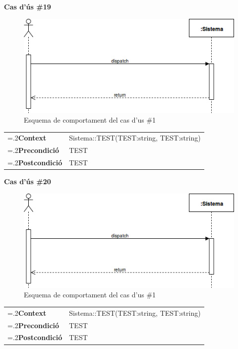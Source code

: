 \clearpage
\noindent\textbf{\large Cas d'ús \#19}\\
\begin{figure}[H]
\centering
\includegraphics[scale=0.6]{Figures/casdus_00.png}
\caption{Esquema de comportament del cas d'us \#1}
\end{figure}
\begin{table}[h]
\noindent
\begin{tabularx}{\linewidth}{
>{\hsize=.2\hsize}X%
>{\hsize=0.8\hsize}X%
}
\textbf{Context} 		& Sistema::TEST(TEST:string, TEST:string) \\
\textbf{Precondició} 	& TEST \\
\textbf{Postcondició}	& TEST \\
\end{tabularx}
\label{}
\end{table}

\noindent\textbf{\large Cas d'ús \#20}\\
\begin{figure}[H]
\centering
\includegraphics[scale=0.6]{Figures/casdus_00.png}
\caption{Esquema de comportament del cas d'us \#1}
\end{figure}
\begin{table}[h]
\noindent
\begin{tabularx}{\linewidth}{
>{\hsize=.2\hsize}X%
>{\hsize=0.8\hsize}X%
}
\textbf{Context} 		& Sistema::TEST(TEST:string, TEST:string) \\
\textbf{Precondició} 	& TEST \\
\textbf{Postcondició}	& TEST \\
\end{tabularx}
\label{}
\end{table}

